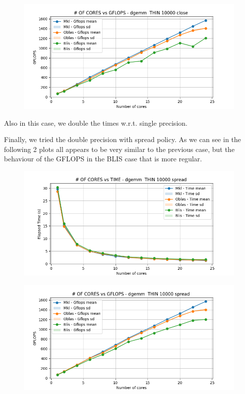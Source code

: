 \documentclass[12pt, titlepage]{report}
\begin{document}
\begin{figure}[H]
    \centering
    \includegraphics[width=\textwidth]{THIN scalability/dgemm__THIN_10000_close_gflops.png}
\end{figure}

Also in this case, we double the times w.r.t. single precision.

Finally, we tried the double precision with spread policy. As we can see in the following 2 plots all appears to be very similar to the previous case, but the behaviour of the GFLOPS in the BLIS case that is more regular.
\begin{figure}[H]
    \centering
    \includegraphics[width=\textwidth]{THIN scalability/dgemm__THIN_10000_spread_time.png}
\end{figure}

\begin{figure}[H]
    \centering
    \includegraphics[width=\textwidth]{THIN scalability/dgemm__THIN_10000_spread_gflops.png}
\end{figure}
\end{document}
